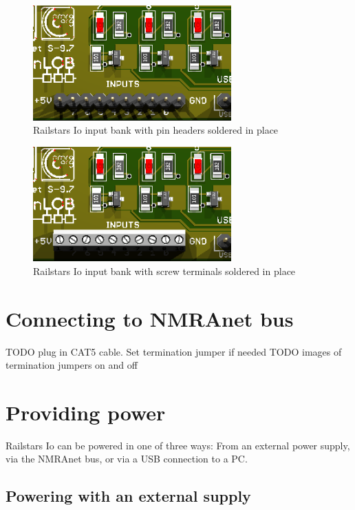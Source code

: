 \documentclass[12pt]{book}
\begin{document}
\begin{figure}[htbp]
\begin{center}
\includegraphics[width=3in]{images/IoInputPinheader.png}
\caption{Railstars Io input bank with pin headers soldered in place}
\label{pinheader}
\end{center}
\end{figure}

\begin{figure}[htbp]
\begin{center}
\includegraphics[width=3in]{images/IoInputsWithScrewTerminal.png}
\caption{Railstars Io input bank with screw terminals soldered in place}
\label{screwterminal}
\end{center}
\end{figure}

\section{Connecting to NMRAnet bus}

TODO plug in CAT5 cable. Set termination jumper if needed
TODO images of termination jumpers on and off

\section{Providing power}

Railstars Io can be powered in one of three ways: From an external power supply, via the NMRAnet bus, or via a USB connection to a PC.

\subsection{Powering with an external supply}
\label{externalpower}
\end{document}
